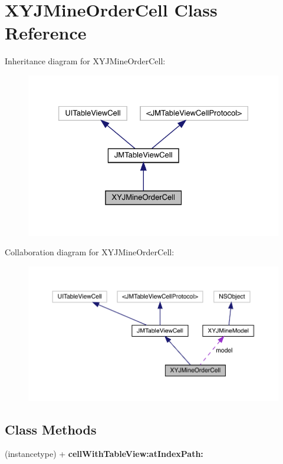 \hypertarget{interface_x_y_j_mine_order_cell}{}\section{X\+Y\+J\+Mine\+Order\+Cell Class Reference}
\label{interface_x_y_j_mine_order_cell}


Inheritance diagram for X\+Y\+J\+Mine\+Order\+Cell\+:\nopagebreak
\begin{figure}[H]
\begin{center}
\leavevmode
\includegraphics[width=326pt]{interface_x_y_j_mine_order_cell__inherit__graph}
\end{center}
\end{figure}


Collaboration diagram for X\+Y\+J\+Mine\+Order\+Cell\+:\nopagebreak
\begin{figure}[H]
\begin{center}
\leavevmode
\includegraphics[width=350pt]{interface_x_y_j_mine_order_cell__coll__graph}
\end{center}
\end{figure}
\subsection*{Class Methods}
\begin{DoxyCompactItemize}
\item 
\mbox{\label{interface_x_y_j_mine_order_cell_ade86696185ce5236051f27e6f5782e0e}} 
(instancetype) + {\bfseries cell\+With\+Table\+View\+:at\+Index\+Path\+:}
\end{DoxyCompactItemize}
